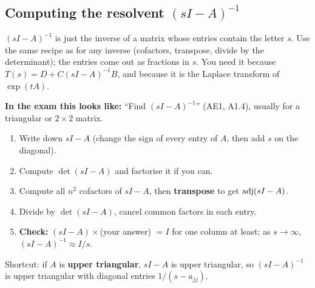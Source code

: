 \subsection{Computing the resolvent \texorpdfstring{$(sI-A)^{-1}$}{(sI-A)\^{}-1}}\label{sec:resolvent}\label{ss:2-2}
\begin{plainbox}
$(sI-A)^{-1}$ is just the inverse of a matrix whose entries contain the letter $s$.
Use the same recipe as for any inverse (cofactors, transpose, divide by the determinant); the entries come out as fractions in $s$.
You need it because $T(s)=D+C(sI-A)^{-1}B$, and because it is the Laplace transform of $\exp(tA)$.
\par\smallskip\textbf{In the exam this looks like:} ``Find $(sI-A)^{-1}$'' (AE1, A1.4), usually for a triangular or $2\times2$ matrix.
\end{plainbox}
\begin{methodbox}
\begin{enumerate}
\item Write down $sI-A$ (change the sign of every entry of $A$, then add $s$ on the diagonal).
\item Compute $\det(sI-A)$ and factorise it if you can.
\item Compute all $n^2$ cofactors of $sI-A$, then \textbf{transpose} to get $\operatorname{adj}(sI-A)$.
\item Divide by $\det(sI-A)$, cancel common factors in each entry.
\item \textbf{Check:} $(sI-A)\times$(your answer) $=I$ for one column at least; as $s\to\infty$, $(sI-A)^{-1}\approx I/s$.
\end{enumerate}
Shortcut: if $A$ is \textbf{upper triangular}, $sI-A$ is upper triangular, so $(sI-A)^{-1}$ is upper triangular with diagonal entries $1/(s-a_{jj})$.
\end{methodbox}

